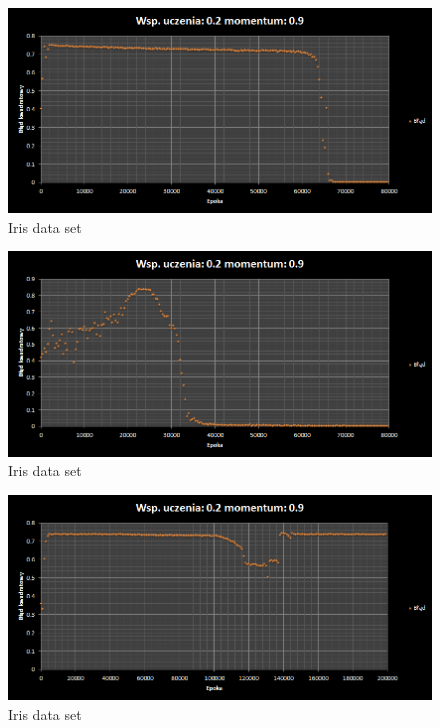 \documentclass{classrep}
\begin{document}
\begin{figure}[ht]
\centering
			\includegraphics[scale=0.65]{pictures/Iris03.png}
	\caption{Iris data set}
	\label{fig:Iris data set}
\end{figure}

\begin{figure}[ht]
\centering
			\includegraphics[scale=0.65]{pictures/Iris04.png}
	\caption{Iris data set}
	\label{fig:Iris data set}
\end{figure}

\begin{figure}[ht]
\centering
			\includegraphics[scale=0.65]{pictures/Iris05.png}
	\caption{Iris data set}
	\label{fig:Iris data set}
\end{figure}
\end{document}
